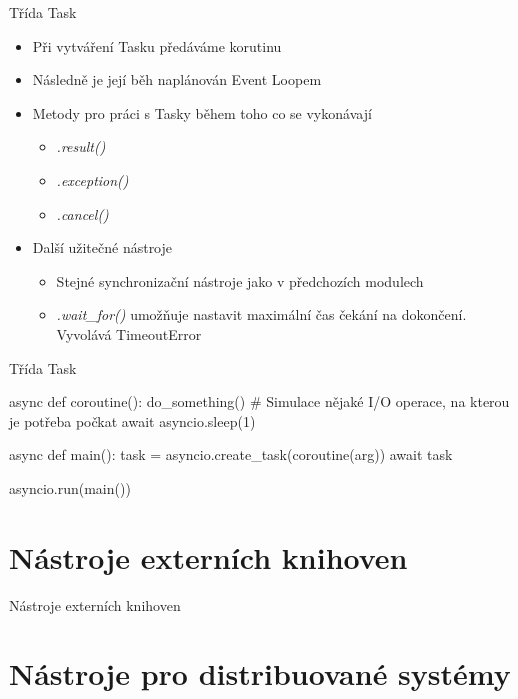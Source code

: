 \documentclass{beamer}
\begin{document}
\begin{frame}{Třída Task}
    \begin{itemize}
        \item Při vytváření Tasku předáváme korutinu
        \item Následně je její běh naplánován Event Loopem
        \item Metody pro práci s Tasky během toho co se vykonávají
        \begin{itemize}
            \item \textit{.result()}
            \item \textit{.exception()}
            \item \textit{.cancel()}
        \end{itemize}
        
        \vskip 0.25in
        \item Další užitečné nástroje
        \begin{itemize}
            \item Stejné synchronizační nástroje jako v předchozích modulech

            \item \textit{.wait\_for()} umožňuje nastavit maximální čas čekání na dokončení. Vyvolává TimeoutError
        \end{itemize}
    \end{itemize}
\end{frame}

\begin{frame}[fragile]{Třída Task}
    \scriptsize
    \begin{semiverbatim}
    async def coroutine(): 
    	do_something()
    	# Simulace nějaké I/O operace, na kterou je potřeba počkat
    	await asyncio.sleep(1) 

    async def main():
        task = asyncio.create_task(coroutine(arg))
        await task

    asyncio.run(main())
    \end{semiverbatim}
\end{frame}

\section{Nástroje externích knihoven}
\begin{frame}{Nástroje externích knihoven}

\end{frame}

\section{Nástroje pro distribuované systémy}
\end{document}
